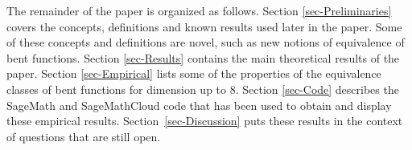 \documentclass[12pt,a4paper]{article}
\newcommand{\mb}[1]{\mathbb{#1}}
\newcommand{\Z}{\mb{Z}}
\newtheorem{Theorem}{Theorem}
\begin{document}
%
%
The remainder of the paper is organized as follows.
Section \ref{sec-Preliminaries} covers the concepts, definitions and known results used later in the paper.
Some of these concepts and definitions are novel, such as new notions of equivalence of bent
functions.
Section \ref{sec-Results} contains the main theoretical results of the paper.
Section \ref{sec-Empirical} lists some of the properties of the equivalence classes of bent functions for dimension up to 8.
Section \ref{sec-Code} describes the SageMath and SageMathCloud code that has been used to obtain
and display these empirical results.
Section~\ref{sec-Discussion} puts these results in the context of questions that are still open.
%
%
%
%
%
%
%
%
%
%
%
\end{document}
